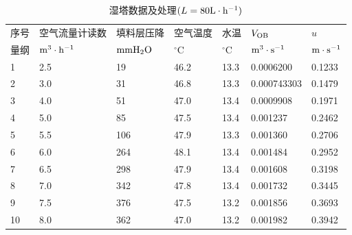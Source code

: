 \documentclass[UTF8,AutoFakeBold,a4paper]{article}
\begin{document}
\begin{table}[h]
\caption{湿塔数据及处理$(L = 80 \rm{L}\cdot\rm{h}^{-1})$}
		\centering
		\begin{tabular}{p{1.5cm}<{\centering} p{3cm}<{\centering} p{3cm}<{\centering} p{2cm}<{\centering} p{2cm}<{\centering} p{3cm}<{\centering} p{3cm}<{\centering}}
		\toprule
		
   序号 & 空气流量计读数 & 填料层压降 & 空气温度&水温 & $V_{\rm{OB}}$ & $u$ \\ 

  量纲&$\rm{m}^{3}\cdot\rm{h}^{-1}$&$\rm{mm}\ce{H2O}$&$^\circ$C&$^\circ$C&$\rm{m}^{3}\cdot\rm{s}^{-1}$&$\rm{m}\cdot\rm{s}^{-1}$\\
 \midrule
            1 & 2.5 & 19 & 46.2 & 13.3 & 0.0006200 & 0.1233 \\ 
        2 & 3.0 & 31 & 46.8 & 13.3 & 0.000743303 & 0.1479 \\ 
        3 & 4.0 & 51 & 47.0 & 13.4 & 0.0009908 & 0.1971 \\ 
        4 & 5.0 & 85 & 47.5 & 13.4 & 0.001237 & 0.2462 \\ 
        5 & 5.5 & 106 & 47.9 & 13.3 & 0.001360 & 0.2706 \\ 
        6 & 6.0 & 264 & 48.1 & 13.4 & 0.001484 & 0.2952 \\ 
        7 & 6.5 & 298 & 47.9 & 13.4 & 0.001608 & 0.3198 \\ 
        8 & 7.0 & 342 & 47.8 & 13.4 & 0.001732 & 0.3445 \\ 
        9 & 7.5 & 376 & 47.5 & 13.2 & 0.001856 & 0.3693 \\ 
        10 & 8.0 & 362 & 47.0 & 13.2 & 0.001982 & 0.3942 \\ 		
        \bottomrule
		\end{tabular}	
		\label{ta1}
		
\end{table}
\end{document}
